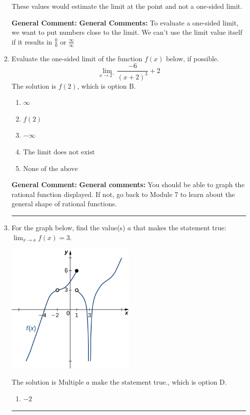 \documentclass{extbook}[14pt]
\newcommand{\litem}[1]{\item #1

\rule{\textwidth}{0.4pt}}
\begin{document}
\begin{enumerate}
{\begin{enumerate}[label=\Alph*.]
These values would estimate the limit at the point and not a one-sided limit.
\end{enumerate}

\textbf{General Comment:} \textbf{General Comments:} To evaluate a one-sided limit, we want to put numbers close to the limit. We can't use the limit value itself if it results in $\frac{0}{0}$ or $\frac{\infty}{\infty}$
}
\litem{
Evaluate the one-sided limit of the function $f(x)$ below, if possible.
\[ \lim_{x \rightarrow 2^-} \frac{-6}{(x+2)^3}+2 \]The solution is \( f(2) \), which is option B.\begin{enumerate}[label=\Alph*.]
\item \( \infty \)


\item \( f(2) \)


\item \( -\infty \)


\item \( \text{The limit does not exist} \)


\item \( \text{None of the above} \)


\end{enumerate}

\textbf{General Comment:} \textbf{General comments:} You should be able to graph the rational function displayed. If not, go back to Module 7 to learn about the general shape of rational functions.
}
\litem{
For the graph below, find the value(s) $a$ that makes the statement true: $ \displaystyle \lim_{x \rightarrow a} f(x) = 3$.

\begin{center}
    \includegraphics[width=0.5\textwidth]{../Figures/evaluateLimitGraphicallyCopyC.png}
\end{center}


The solution is \( \text{Multiple } a \text{ make the statement true}. \), which is option D.\begin{enumerate}[label=\Alph*.]
\item \( -2 \)



\end{enumerate}}
\end{enumerate}
\end{document}

